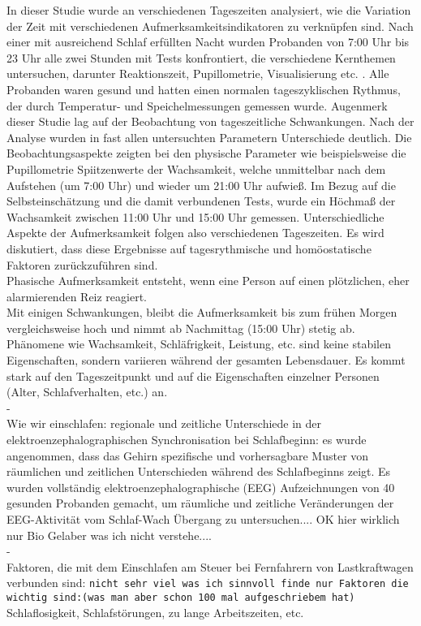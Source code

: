 In dieser Studie wurde an verschiedenen Tageszeiten analysiert, wie die Variation der Zeit mit verschiedenen Aufmerksamkeitsindikatoren zu verknüpfen sind. Nach einer mit ausreichend Schlaf erfüllten Nacht wurden Probanden von 7:00 Uhr bis 23 Uhr alle zwei Stunden mit Tests konfrontiert, die verschiedene Kernthemen untersuchen, darunter Reaktionszeit, Pupillometrie, Visualisierung etc. . Alle Probanden waren gesund und hatten einen normalen tageszyklischen Rythmus, der durch Temperatur- und Speichelmessungen gemessen wurde. Augenmerk dieser Studie lag auf der Beobachtung von tageszeitliche Schwankungen. Nach der Analyse wurden in fast allen untersuchten Parametern Unterschiede deutlich. Die Beobachtungsaspekte zeigten bei den physische Parameter wie beispielsweise die Pupillometrie Spiitzenwerte der Wachsamkeit, welche unmittelbar nach dem Aufstehen (um 7:00 Uhr) und wieder um 21:00 Uhr aufwieß. Im Bezug auf die Selbsteinschätzung und die damit verbundenen Tests, wurde ein Höchmaß der Wachsamkeit zwischen 11:00 Uhr und 15:00 Uhr gemessen. Unterschiedliche Aspekte der Aufmerksamkeit folgen also verschiedenen Tageszeiten. Es wird diskutiert, dass diese Ergebnisse auf tagesrythmische und homöostatische Faktoren zurückzuführen sind.\\
Phasische Aufmerksamkeit entsteht, wenn eine Person auf einen plötzlichen, eher alarmierenden Reiz reagiert.\\
Mit einigen Schwankungen, bleibt die Aufmerksamkeit bis zum frühen Morgen vergleichsweise hoch und nimmt ab Nachmittag (15:00 Uhr) stetig ab.\\
Phänomene wie Wachsamkeit, Schläfrigkeit, Leistung, etc. sind keine stabilen Eigenschaften, sondern variieren während der gesamten Lebensdauer. Es kommt stark auf den Tageszeitpunkt und auf die Eigenschaften einzelner Personen (Alter, Schlafverhalten, etc.) an.\\

-\cite{jewett1999time}\\
Wie wir einschlafen: regionale und zeitliche Unterschiede in der elektroenzephalographischen Synchronisation bei Schlafbeginn:
es wurde angenommen, dass das Gehirn spezifische und vorhersagbare Muster von räumlichen und zeitlichen Unterschieden während des Schlafbeginns zeigt.
Es wurden vollständig elektroenzephalographische (EEG) Aufzeichnungen von 40 gesunden Probanden gemacht, um räumliche und zeitliche Veränderungen der EEG-Aktivität vom Schlaf-Wach Übergang zu untersuchen.... OK hier wirklich nur Bio Gelaber was ich nicht verstehe....\\

- \cite{mccartt2000factors}\\
Faktoren, die mit dem Einschlafen am Steuer bei Fernfahrern von Lastkraftwagen verbunden sind: \texttt{nicht sehr viel was ich sinnvoll finde nur Faktoren die wichtig sind:(was man aber schon 100 mal aufgeschriebem hat)} Schlaflosigkeit, Schlafstörungen, zu lange Arbeitszeiten, etc.